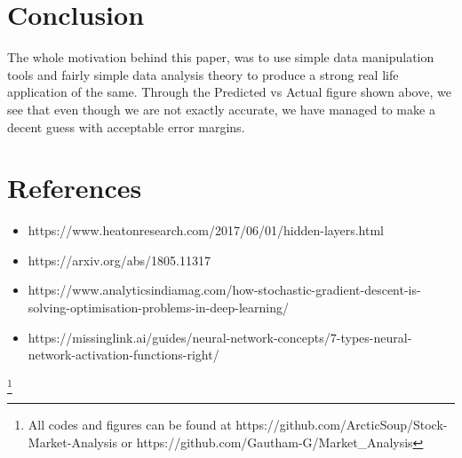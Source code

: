 \documentclass[12pt]{report}
\begin{document}
\section{Conclusion}
The whole motivation behind this paper, was to use simple data manipulation tools and fairly simple data analysis theory to produce a strong real life application of the same.
Through the Predicted vs Actual figure shown above, we see that even though we are not exactly accurate, we have managed to make a decent guess with acceptable error margins.
\section{References}
\begin{itemize}
    \item https://www.heatonresearch.com/2017/06/01/hidden-layers.html
    \item https://arxiv.org/abs/1805.11317
    \item https://www.analyticsindiamag.com/how-stochastic-gradient-descent-is-solving-optimisation-problems-in-deep-learning/
    \item https://missinglink.ai/guides/neural-network-concepts/7-types-neural-network-activation-functions-right/
\end{itemize}
\footnote{All codes and figures can be found at https://github.com/ArcticSoup/Stock-Market-Analysis or https://github.com/Gautham-G/Market\_Analysis}
\end{document}
